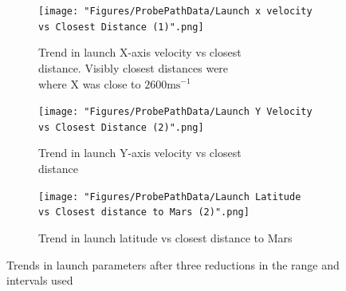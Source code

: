 \documentclass{article}
\begin{document}
                \begin{figure}[!ht]
                    \centering
                    \begin{subfigure}{0.4\textwidth}
                        \centering
                        \texttt{[image: "Figures/ProbePathData/Launch x velocity vs Closest Distance (1)".png]}
                        \caption{Trend in launch X-axis velocity vs closest \\distance. Visibly closest distances were\\ where X was close to $2600 \si{\meter \second^{-1}} $}

                    \end{subfigure}
                    \begin{subfigure}{0.4\textwidth}
                        \centering
                        \texttt{[image: "Figures/ProbePathData/Launch Y Velocity vs Closest Distance (2)".png]}
                        \caption{Trend in launch Y-axis velocity vs closest \\distance }
                    \end{subfigure}
                    \begin{subfigure}{0.6\textwidth}
                        \centering
                        \texttt{[image: "Figures/ProbePathData/Launch Latitude vs Closest distance to Mars (2)".png]}
                        \caption{Trend in launch latitude vs closest distance to Mars}
                    \end{subfigure}
                    \caption{Trends in launch parameters after three reductions in the range and intervals used}
                    \label{fig:Probe3rdDataSet}
                \end{figure}
\end{document}
